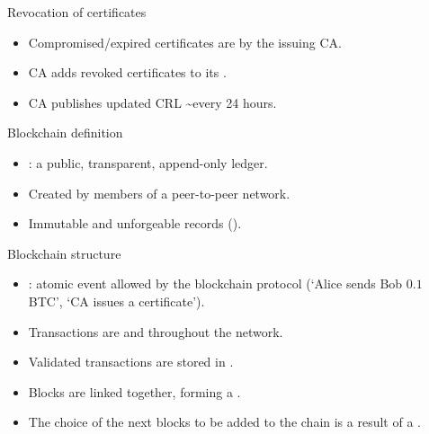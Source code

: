 \begin{frame}{Revocation of certificates}

\begin{itemize}
\item Compromised/expired certificates are
 by the issuing CA.
\item CA adds revoked certificates to its
.
\item CA publishes updated CRL
\textasciitilde every 24 hours.
\end{itemize}
\end{frame}


\begin{frame}{Blockchain definition}

\begin{itemize}
\item {}: a public, transparent,
append-only ledger.
\item Created by members of a peer-to-peer
network.
\item Immutable and unforgeable records ().
\end{itemize}

\end{frame}



\begin{frame}{Blockchain structure}

\begin{itemize}
\item {}: atomic event
allowed by the blockchain protocol (`Alice sends Bob $0.1$ BTC', `CA issues a certificate').
\item Transactions are  and 
throughout the network.
\item Validated transactions are
stored in .
\item Blocks are linked together,
forming a .
\item The choice of the next blocks to be
added to the chain is a result of a .
\end{itemize}

\end{frame}


